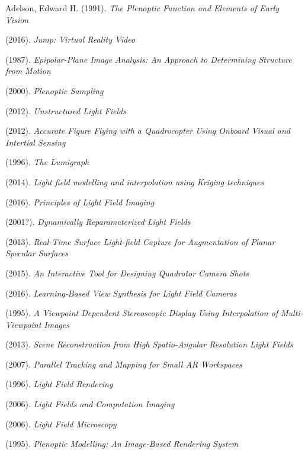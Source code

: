 \documentclass[12pt]{report}
\begin{document}
\begin{thebibliography}{10}%

	Adelson, Edward H. (1991). \emph{The Plenoptic Function and Elements of Early Vision}

	(2016). \emph{Jump: Virtual Reality Video}

	(1987). \emph{Epipolar-Plane Image Analysis: An Approach to Determining Structure from Motion}

	(2000). \emph{Plenoptic Sampling}

	(2012). \emph{Unstructured Light Fields}

	(2012). \emph{Accurate Figure Flying with a Quadrocopter Using Onboard Visual and Intertial Sensing}

	(1996). \emph{The Lumigraph}
	
	(2014). \emph{Light field modelling and interpolation using Kriging techniques}	
	
	(2016). \emph{Principles of Light Field Imaging}	
	
	(2001?). \emph{Dynamically Reparameterized Light Fields}

	(2013). \emph{Real-Time Surface Light-field Capture for Augmentation of Planar Specular Surfaces}
	
	(2015). \emph{An Interactive Tool for Designing Quadrotor Camera Shots}

	(2016). \emph{Learning-Based View Synthesis for Light Field Cameras}

	(1995). \emph{A Viewpoint Dependent Stereoscopic Display Using Interpolation of Multi-Viewpoint Images}
	
	(2013). \emph{Scene Reconstruction from High Spatio-Angular Resolution Light Fields}	
	
	(2007). \emph{Parallel Tracking and Mapping for Small AR Workspaces}	
	
	(1996). \emph{Light Field Rendering}
	
	(2006). \emph{Light Fields and Computation Imaging}

	(2006). \emph{Light Field Microscopy}
	
	(1995). \emph{Plenoptic Modelling: An Image-Based Rendering System}


\end{thebibliography}
\end{document}

